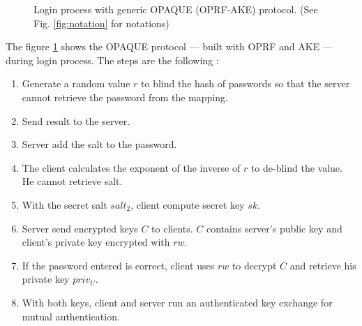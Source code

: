 \documentclass[../report.tex]{subfiles}
\begin{document}
\begin{figure}[h]
 \centering

 \setlength{\fboxsep}{10pt}
 \setlength{\fboxrule}{1pt}

 \caption{Login process with generic OPAQUE (OPRF-AKE) protocol. (See Fig. \ref{fig:notation} for notations)}
 \label{fig:OPAQUE_AKE}
\end{figure}

The figure \ref{fig:OPAQUE_AKE} shows the OPAQUE protocol --- built with OPRF and AKE --- during login process.
The steps are the following :


\begin{enumerate}
 \item Generate a random value $r$ to blind the hash of passwords so that the server cannot retrieve the password from the mapping.
 \item Send result to the server.
 \item Server add the salt to the password.
 \item The client calculates the exponent of the inverse of $r$ to de-blind the value. He cannot retrieve salt.
 \item With the secret salt $salt_2$, client compute secret key $sk$.
 \item Server send encrypted keys $C$ to clients. $C$ contains server's public key and client's private key encrypted with $rw$.
 \item If the password entered is correct, client uses $rw$ to decrypt $C$ and retrieve his private key $priv_U$.
 \item With both keys, client and server run an authenticated key exchange for mutual authentication.
\end{enumerate}
\end{document}
